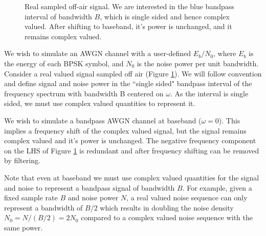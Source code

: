 \documentclass{article}
\begin{document}
\begin{figure}[H]
\caption{Real sampled off-air signal.  We are interested in the blue bandpass interval of bandwidth $B$, which is single sided and hence complex valued. After shifting to baseband, it's power is unchanged, and it remains complex valued.}
\vspace{5mm}
\label{fig:bandpass}
\begin{center}
\end{center}
\end{figure}

We wish to simulate an AWGN channel with a user-defined $E_b/N_0$, where $E_b$ is the energy of each BPSK symbol, and $N_0$ is the noise power per unit bandwidth.  Consider a real valued signal sampled off air (Figure \ref{fig:bandpass}).  We will follow convention and define signal and noise power in the ``single sided" bandpass interval of the frequency spectrum with bandwidth B centered on $\omega$.  As the interval is single sided, we must use complex valued quantities to represent it.

We wish to simulate a bandpass AWGN channel at baseband ($\omega=0$).  This implies a frequency shift of the complex valued signal, but the signal remains complex valued and it's power is unchanged. The negative frequency component on the LHS of Figure \ref{fig:bandpass} is redundant and after frequency shifting can be removed by filtering.

Note that even at baseband we must use complex valued quantities for the signal and noise to represent a bandpass signal of bandwidth $B$.  For example, given a fixed sample rate $B$ and noise power $N$, a real valued noise sequence can only represent a bandwidth of $B/2$ which results in doubling the noise density $N_0=N/(B/2)=2N_0$ compared to a complex valued noise sequence with the same power.   
\end{document}
